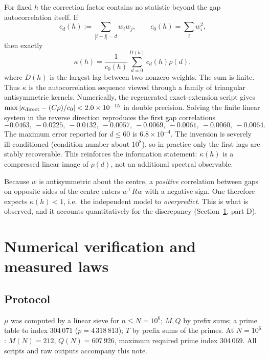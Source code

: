 \documentclass[11pt]{amsart}
\numberwithin{equation}{section}
\theoremstyle{plain}
\theoremstyle{definition}
\theoremstyle{remark}
\newcommand{\mob}{\mu}
\newcommand{\Mert}{M}
\newcommand{\Sq}{Q}
\begin{document}
For fixed $h$ the correction factor contains no statistic beyond the gap
autocorrelation itself. If
\begin{equation}
\label{eq:cd-definition}
c_d(h):=\sum_{|i-j|=d}w_iw_j,\qquad c_0(h)=\sum_iw_i^2,
\end{equation}
then exactly
\begin{equation}\label{eq:kappa-linear}
\boxed{\qquad
\kappa(h)=\frac{1}{c_0(h)}\sum_{d=0}^{D(h)}c_d(h)\rho(d),
\qquad}
\end{equation}
where $D(h)$ is the largest lag between two nonzero weights. The sum is finite.
Thus $\kappa$ is the autocorrelation sequence viewed through a family of
triangular antisymmetric kernels. Numerically,
the regenerated exact-extension script gives
$\max|\kappa_{\rm direct}-(C\rho)/c_0|<2.0\times10^{-15}$ in double
precision. Solving the finite
linear system in the reverse direction reproduces the first gap correlations
\begin{equation}
\label{eq:rho-recovered-values}
-0.0463,\ -0.0225,\ -0.0132,\ -0.0057,\ -0.0069,\ -0.0061,\ -0.0060,\ -0.0064.
\end{equation}
The maximum error reported for $d\le60$ is $6.8\times10^{-4}$. The inversion is severely
ill-conditioned (condition number about $10^8$), so in practice only the first
lags are stably recoverable. This reinforces the information statement:
$\kappa(h)$ is a compressed linear image of $\rho(d)$, not an additional
spectral observable.

Because $w$ is antisymmetric about the centre, a \emph{positive} correlation
between gaps on opposite sides of the centre enters $w^{\!\top}Rw$ with a
negative sign. One therefore expects $\kappa(h)<1$, i.e.\ the independent model
to \emph{overpredict}. This is what is observed, and it accounts quantitatively
for the discrepancy (Section~\ref{sec:numeric}, part D).

\section{Numerical verification and measured laws}
\label{sec:numeric}

\subsection{Protocol}
\label{sec:num-protocol}
$\mob$ was computed by a linear sieve for $n\le N=10^{6}$; $M,Q$ by prefix sums;
a prime table to index $304\,071$ ($p=4\,318\,813$); $T$ by prefix sums of the
primes. At $N=10^{6}$: $\Mert(N)=212$, $\Sq(N)=607\,926$, maximum required prime
index $304\,069$. All scripts and raw outputs accompany this note.
\end{document}
